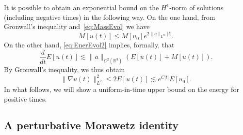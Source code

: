 \documentclass[AHL,Unicode,longabstracts,published]{cedram}
\newcommand*\R{\mathbb{R}}
\begin{document}
\begin{rema}\label{prpBackWP}
It is possible to obtain an exponential bound on the $H^1$-norm of solutions (including negative times) in the following way. On the one hand, from Gronwall's inequality and~\eqref{eq:MassEvol} we have
\begin{equation*}
M[u(t)] \leq M[u_0] e^{2\| a \|_{L^{\infty}} |t|}.
\end{equation*}
On the other hand, \eqref{eq:EnerEvol2} implies, formally, that
\[
\frac{d}{dt} E[u(t)]
\lesssim \| a \|_{C^2(\R^3)} \left(E[u(t)] + M[u(t)] \right).
\]
By Gronwall's inequality, we thus obtain
\begin{equation*}
\| \nabla u(t) \|_{L^2}^2 \leq 2 E[u(t)] \lesssim e^{C|t|} E[u_0].
\end{equation*}
In what follows, we will show a uniform-in-time upper bound on the energy for positive times.
\end{rema}

\subsection{A perturbative Morawetz identity} \label{ss:mor}
\end{document}
